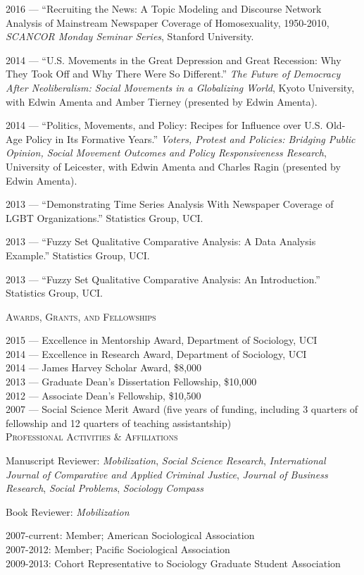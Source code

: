 \documentclass[11pt]{article}
\newcommand{\sectionheader}[1]{
{\Large
\textsc{#1}}
}
\begin{document}
2016 --- ``Recruiting the News: A Topic Modeling and Discourse Network Analysis of Mainstream Newspaper Coverage of Homosexuality, 1950-2010, \textit{SCANCOR Monday Seminar Series}, Stanford University.

2014 --- ``U.S. Movements in the Great Depression and Great Recession: Why They Took Off and Why There Were So Different.'' \textit{The Future of Democracy After Neoliberalism: Social Movements in a Globalizing World}, Kyoto University, with Edwin Amenta and Amber Tierney (presented by Edwin Amenta). 

2014 --- ``Politics, Movements, and Policy: Recipes for Influence over U.S. Old-Age Policy in Its Formative Years.'' \textit{Voters, Protest and Policies: Bridging Public Opinion, Social Movement Outcomes and Policy Responsiveness Research}, University of Leicester, with Edwin Amenta and Charles Ragin (presented by Edwin Amenta).

2013 --- ``Demonstrating Time Series Analysis With Newspaper Coverage of LGBT Organizations.'' Statistics Group, UCI.

2013 --- ``Fuzzy Set Qualitative Comparative Analysis: A Data Analysis Example.'' Statistics Group, UCI.

2013 --- ``Fuzzy Set Qualitative Comparative Analysis: An Introduction.'' Statistics Group, UCI.



\sectionheader{Awards, Grants, and Fellowships}

2015 --- Excellence in Mentorship Award, Department of Sociology, UCI\\
2014 --- Excellence in Research Award, Department of Sociology, UCI\\
2014 --- James Harvey Scholar Award, \$8,000\\
2013 --- Graduate Dean's Dissertation Fellowship, \$10,000\\
2012 --- Associate Dean's Fellowship, \$10,500\\
2007 --- Social Science Merit Award (five years of funding, including 3 quarters of fellowship and 12 quarters of teaching assistantship)\\


\sectionheader{Professional Activities \& Affiliations}

Manuscript Reviewer: \textit{Mobilization}, \textit{Social Science Research}, \textit{International Journal of Comparative and Applied Criminal Justice}, \textit{Journal of Business Research}, \textit{Social Problems}, \textit{Sociology Compass}

Book Reviewer: \textit{Mobilization}

2007-current:	Member; American Sociological Association\\
2007-2012:	Member; Pacific Sociological Association\\
2009-2013:	Cohort Representative to Sociology Graduate Student Association
\end{document}

